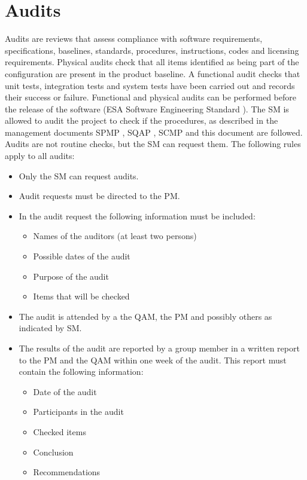 \documentclass[%
		pathtobase=..,%
		titlefull={Software Validation and Verification Plan},%
		titleabbr=SVVP,%
		version=0.1]{fingerpaint}
\begin{document}
\section{Audits}
    Audits are reviews that assess compliance with software requirements, specifications, baselines,
    standards, procedures, instructions, codes and licensing requirements. Physical audits check that
    all items identified as being part of the configuration are present in the product baseline. A
    functional audit checks that unit tests, integration tests and system tests have been carried out
    and records their success or failure. Functional and physical audits can be performed before
    the release of the software (ESA Software Engineering Standard \cite{esa}). The SM is
    allowed to audit the project to check if the procedures, as described in the management
    documents SPMP \cite{spmp}, SQAP \cite{sqap}, SCMP \cite{scmp} and this document are followed. Audits are not routine
    checks, but the SM can request them.
        The following rules apply to all audits:
\begin{itemize}
\item Only the SM can request audits.
\item Audit requests must be directed to the PM.
\item In the audit request the following information must be included:
\begin{itemize}
\item Names of the auditors (at least two persons)
\item Possible dates of the audit
\item Purpose of the audit
\item Items that will be checked
\end{itemize}
\item The audit is attended by a the QAM, the PM and possibly others as indicated by SM.
\item The results of the audit are reported by a group member in a written report to the PM and the QAM within one week of the audit. This report must contain the following information:

	\begin{itemize}
	\item Date of the audit
	\item Participants in the audit
	\item Checked items
	\item Conclusion
	\item Recommendations
	\end{itemize}
\end{itemize}
\end{document}
